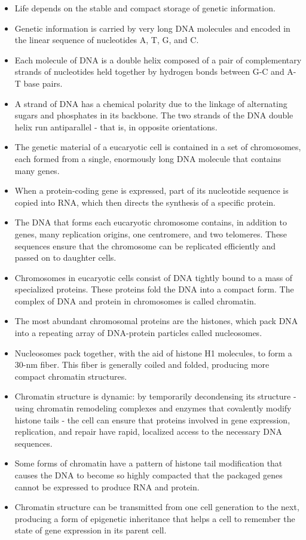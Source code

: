 \begin{itemize}
\item Life depends on the stable and compact storage of genetic
information.
\item Genetic information is carried by very long DNA molecules and
encoded in the linear sequence of nucleotides A, T, G, and C.
\item Each molecule of DNA is a double helix composed of a pair of complementary
strands of nucleotides held together by hydrogen bonds
between G-C and A-T base pairs.
\item A strand of DNA has a chemical polarity due to the linkage of alternating
sugars and phosphates in its backbone. The two strands of the
DNA double helix run antiparallel - that is, in opposite orientations.
\item The genetic material of a eucaryotic cell is contained in a set of chromosomes,
each formed from a single, enormously long DNA molecule
that contains many genes.
\item When a protein-coding gene is expressed, part of its nucleotide
sequence is copied into RNA, which then directs the synthesis of a
specific protein.
\item The DNA that forms each eucaryotic chromosome contains, in addition
to genes, many replication origins, one centromere, and two
telomeres. These sequences ensure that the chromosome can be replicated
efficiently and passed on to daughter cells.
\item Chromosomes in eucaryotic cells consist of DNA tightly bound to a
mass of specialized proteins. These proteins fold the DNA into a compact form.
The complex of DNA and protein in chromosomes is called chromatin.
\item The most abundant chromosomal proteins are the histones, which
pack DNA into a repeating array of DNA-protein particles called
nucleosomes.
\item Nucleosomes pack together, with the aid of histone H1 molecules, to
form a 30-nm fiber. This fiber is generally coiled and folded, producing
more compact chromatin structures.
\item Chromatin structure is dynamic: by temporarily decondensing its
structure - using chromatin remodeling complexes and enzymes that
covalently modify histone tails - the cell can ensure that proteins
involved in gene expression, replication, and repair have rapid, localized
access to the necessary DNA sequences.
\item Some forms of chromatin have a pattern of histone tail modification
that causes the DNA to become so highly compacted that the packaged
genes cannot be expressed to produce RNA and protein.
\item Chromatin structure can be transmitted from one cell generation to
the next, producing a form of epigenetic inheritance that helps a cell
to remember the state of gene expression in its parent cell.
\end{itemize}

